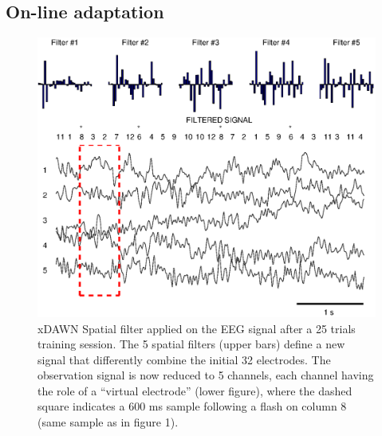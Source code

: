 \documentclass[conference]{IEEEtran}
\begin{document}

\subsection{On-line adaptation} \label{sec:sp_filt}

\begin{figure}
\centerline{
 \includegraphics[width=\linewidth]{figs-copie/fig_filter_2}
}
\caption{xDAWN Spatial filter applied on the EEG signal after a 25 trials training session. The 5 spatial filters (upper bars) define a new
signal that differently combine the initial 32 electrodes. The observation signal is now reduced to 5
channels, each channel having the role of a ``virtual electrode'' (lower figure), where the dashed square indicates 
a 600 ms sample following a flash on column 8 (same sample as in figure 1).}
\label{fig:filter}
\end{figure}
\end{document}
